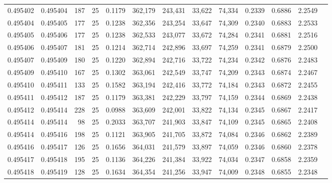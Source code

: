 \begin{tabular}{rrrrrrrrrrrrr}
0.495402 & 0.495404 &   187 &  25 &                                     0.1179 & 362,179 & 243,431 &  33,622 &  74,334 & 0.2339 & 0.6886 & 2.2549 \\
0.495404 & 0.495405 &   177 &  25 &                                     0.1238 & 362,356 & 243,254 &  33,647 &  74,309 & 0.2340 & 0.6883 & 2.2533 \\
0.495405 & 0.495406 &   177 &  25 &                                     0.1238 & 362,533 & 243,077 &  33,672 &  74,284 & 0.2341 & 0.6881 & 2.2516 \\
0.495406 & 0.495407 &   181 &  25 &                                     0.1214 & 362,714 & 242,896 &  33,697 &  74,259 & 0.2341 & 0.6879 & 2.2500 \\
0.495407 & 0.495409 &   180 &  25 &                                     0.1220 & 362,894 & 242,716 &  33,722 &  74,234 & 0.2342 & 0.6876 & 2.2483 \\
0.495409 & 0.495410 &   167 &  25 &                                     0.1302 & 363,061 & 242,549 &  33,747 &  74,209 & 0.2343 & 0.6874 & 2.2467 \\
0.495410 & 0.495411 &   133 &  25 &                                     0.1582 & 363,194 & 242,416 &  33,772 &  74,184 & 0.2343 & 0.6872 & 2.2455 \\
0.495411 & 0.495412 &   187 &  25 &                                     0.1179 & 363,381 & 242,229 &  33,797 &  74,159 & 0.2344 & 0.6869 & 2.2438 \\
0.495412 & 0.495414 &   228 &  25 &                                     0.0988 & 363,609 & 242,001 &  33,822 &  74,134 & 0.2345 & 0.6867 & 2.2417 \\
0.495414 & 0.495414 &    98 &  25 &                                     0.2033 & 363,707 & 241,903 &  33,847 &  74,109 & 0.2345 & 0.6865 & 2.2408 \\
0.495414 & 0.495416 &   198 &  25 &                                     0.1121 & 363,905 & 241,705 &  33,872 &  74,084 & 0.2346 & 0.6862 & 2.2389 \\
0.495416 & 0.495417 &   126 &  25 &                                     0.1656 & 364,031 & 241,579 &  33,897 &  74,059 & 0.2346 & 0.6860 & 2.2378 \\
0.495417 & 0.495418 &   195 &  25 &                                     0.1136 & 364,226 & 241,384 &  33,922 &  74,034 & 0.2347 & 0.6858 & 2.2359 \\
0.495418 & 0.495419 &   128 &  25 &                                     0.1634 & 364,354 & 241,256 &  33,947 &  74,009 & 0.2348 & 0.6855 & 2.2348 \\

\end{tabular}
